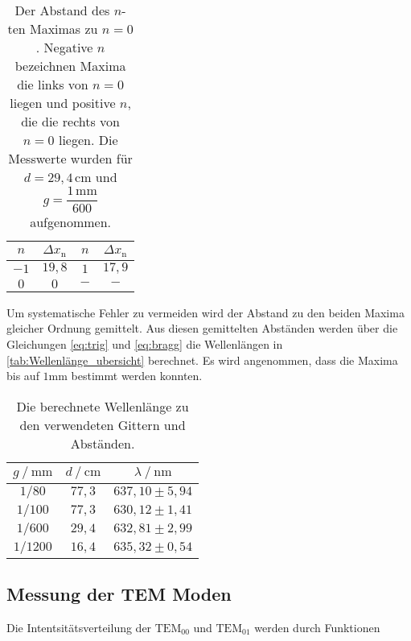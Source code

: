 \begin{table}[H]
    \centering
    \caption{Der Abstand des $n$-ten Maximas zu $n = 0$. Negative $n$ bezeichnen Maxima die links von $n = 0$ liegen und positive $n$, die die rechts von $n = 0$ liegen. Die Messwerte wurden für $d = 29,4 \, \unit{\centi\meter}$ und $g = \dfrac{1 \, \unit{\milli\meter}}{600}$ aufgenommen.}
    \label{tab:Well_1600}
    \begin{tabular}{c c c c}
    \toprule
     $n$ & $\Delta x_\text{n}$ &   $n$ & $\Delta x_\text{n}$\\
    \midrule
    $-1$ & $19,8$   & $1$ & $ 17,9$   \\
    $0$  & $0   $   & $-$ & $ -   $   \\
    \bottomrule
    \end{tabular}
    \end{table}

Um systematische Fehler zu vermeiden wird der Abstand zu den beiden Maxima gleicher Ordnung gemittelt. 
Aus diesen gemittelten Abständen werden über die Gleichungen \eqref{eq:trig} und \eqref{eq:bragg} die Wellenlängen in \autoref{tab:Wellenlänge_ubersicht} berechnet. 
Es wird angenommen, dass die Maxima bis auf $1 \unit{\milli\meter}$ bestimmt werden konnten.

\begin{table}[H]
    \centering
    \caption{Die berechnete Wellenlänge zu den verwendeten Gittern und Abständen.}
    \label{tab:Wellenlänge_ubersicht}
    \begin{tabular}{c c c}
    \toprule
     $g \mathbin{/} \unit{\milli\meter}$ & $d \mathbin{/} \unit{\centi\meter}$ &$\lambda \mathbin{/} \unit{\nano\meter}$ \\
    \midrule
    $1/80  $   & $77,3$   & $637,10 \pm 5,94$\\
    $1/100 $   & $77,3$   & $630,12 \pm 1,41$\\
    $1/600 $   & $29,4$   & $632,81 \pm 2,99$\\
    $1/1200$   & $16,4$   & $635,32 \pm 0,54$\\
    \bottomrule
    \end{tabular}
    \end{table}

\subsection{Messung der TEM Moden}
\label{sec:TEM_moden}

Die Intentsitätsverteilung der $\text{TEM}_{00}$ und $\text{TEM}_{01}$  werden durch Funktionen 

